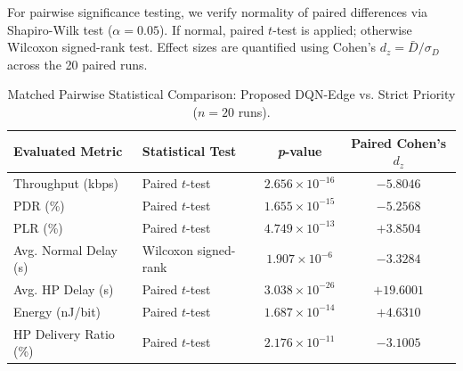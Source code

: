 \documentclass[runningheads,a4paper]{llncs}
\begin{document}
For pairwise significance testing, we verify normality of paired differences via Shapiro-Wilk test ($\alpha = 0.05$). If normal, paired $t$-test is applied; otherwise Wilcoxon signed-rank test. Effect sizes are quantified using Cohen's $d_z = \bar{D} / \sigma_D$ across the 20 paired runs.

\begin{table}[t]
\centering
\caption{WSN Performance Metrics Across 20 Matched Evaluation Runs (Mean $\pm$ 95\% CI).}
\label{tab:main_results}
\end{table}

\begin{table}[ht]
\centering
\caption{Matched Pairwise Statistical Comparison: Proposed DQN-Edge vs. Strict Priority ($n=20$ runs).}
\label{tab:stats}
\scriptsize
\setlength{\tabcolsep}{8pt}
\begin{tabular}{llcc}
\toprule
\textbf{Evaluated Metric} & \textbf{Statistical Test} & \textbf{\textit{p}-value} & \textbf{Paired Cohen's $d_z$} \\
\midrule
Throughput (kbps) & Paired $t$-test & $2.656 \times 10^{-16}$ & $-5.8046$ \\
PDR (\%) & Paired $t$-test & $1.655 \times 10^{-15}$ & $-5.2568$ \\
PLR (\%) & Paired $t$-test & $4.749 \times 10^{-13}$ & $+3.8504$ \\
Avg. Normal Delay (s) & Wilcoxon signed-rank & $1.907 \times 10^{-6}$ & $-3.3284$ \\
Avg. HP Delay (s) & Paired $t$-test & $3.038 \times 10^{-26}$ & $+19.6001$ \\
Energy (nJ/bit) & Paired $t$-test & $1.687 \times 10^{-14}$ & $+4.6310$ \\
HP Delivery Ratio (\%) & Paired $t$-test & $2.176 \times 10^{-11}$ & $-3.1005$ \\
\bottomrule
\end{tabular}
\end{table}
\end{document}
